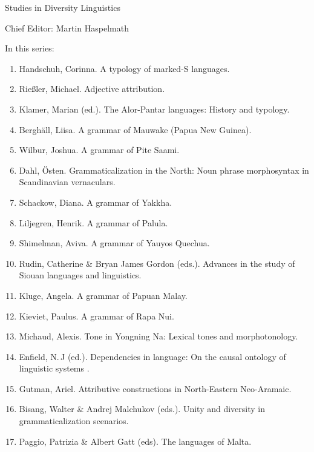 {\large Studies in Diversity Linguistics}

\bigskip

Chief Editor: Martin Haspelmath \\ 

\bigskip

In this series:

\begin{enumerate}
\item Handschuh, Corinna. A typology of marked-S languages.
\item Rießler, Michael. Adjective attribution.
\item Klamer, Marian (ed.). The Alor-Pantar languages: History and typology.
\item Berghäll, Liisa. A grammar of Mauwake (Papua New Guinea).
\item Wilbur, Joshua. A grammar of Pite Saami.
\item Dahl, Östen. Grammaticalization in the North: Noun phrase morphosyntax in Scandinavian vernaculars.
\item Schackow, Diana.    A grammar of Yakkha.
\item Liljegren, Henrik. A grammar of Palula.
\item Shimelman, Aviva. A grammar of Yauyos Quechua. 
\item Rudin, Catherine \& Bryan James Gordon (eds.). Advances in the study of Siouan languages and linguistics.
\item Kluge, Angela. A grammar of Papuan Malay. 
\item Kieviet, Paulus. A grammar of Rapa Nui. 
\item Michaud, Alexis. Tone in Yongning Na: Lexical tones and morphotonology.
\item Enfield, N.\,J (ed.).  Dependencies in language: On the causal ontology of linguistic systems .
\item Gutman, Ariel. Attributive constructions in North-Eastern Neo-Aramaic.
\item Bisang, Walter \& Andrej Malchukov (eds.). Unity and diversity in grammaticalization scenarios.
\item Paggio, Patrizia \& Albert Gatt (eds). The languages of Malta.  
\end{enumerate}



